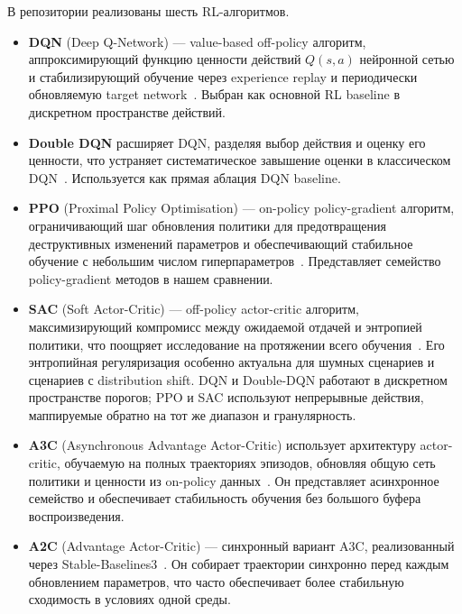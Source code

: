 \documentclass[12pt,a4paper]{article}
\begin{document}
В репозитории реализованы шесть RL-алгоритмов.
\begin{itemize}[leftmargin=*]
    \item \textbf{DQN} (Deep Q-Network) --- value-based off-policy алгоритм,
    аппроксимирующий функцию ценности действий $Q(s, a)$ нейронной сетью и
    стабилизирующий обучение через experience replay и периодически
    обновляемую target network~\cite{mnih2015dqn}. Выбран как основной
    RL baseline в дискретном пространстве действий.

    \item \textbf{Double DQN} расширяет DQN, разделяя выбор действия и оценку
    его ценности, что устраняет систематическое завышение оценки в
    классическом DQN~\cite{van2016ddqn}. Используется как прямая аблация
    DQN baseline.

    \item \textbf{PPO} (Proximal Policy Optimisation) --- on-policy
    policy-gradient алгоритм, ограничивающий шаг обновления политики для
    предотвращения деструктивных изменений параметров и обеспечивающий
    стабильное обучение с небольшим числом гиперпараметров~\cite{schulman2017ppo}.
    Представляет семейство policy-gradient методов в нашем сравнении.

    \item \textbf{SAC} (Soft Actor-Critic) --- off-policy actor-critic алгоритм,
    максимизирующий компромисс между ожидаемой отдачей и энтропией политики,
    что поощряет исследование на протяжении всего обучения~\cite{haarnoja2018sac}.
    Его энтропийная регуляризация особенно актуальна для шумных сценариев и
    сценариев с distribution shift. DQN и Double-DQN работают в дискретном
    пространстве порогов; PPO и SAC используют непрерывные действия,
    маппируемые обратно на тот же диапазон и гранулярность.

    \item \textbf{A3C} (Asynchronous Advantage Actor-Critic) использует архитектуру
    actor-critic, обучаемую на полных траекториях эпизодов, обновляя общую сеть
    политики и ценности из on-policy данных~\cite{mnih2016a3c}. Он представляет
    асинхронное семейство и обеспечивает стабильность обучения без большого буфера
    воспроизведения.

    \item \textbf{A2C} (Advantage Actor-Critic) --- синхронный вариант A3C,
    реализованный через Stable-Baselines3~\cite{stable_baselines3}. Он собирает
    траектории синхронно перед каждым обновлением параметров, что часто
    обеспечивает более стабильную сходимость в условиях одной среды.
\end{itemize}
\end{document}
